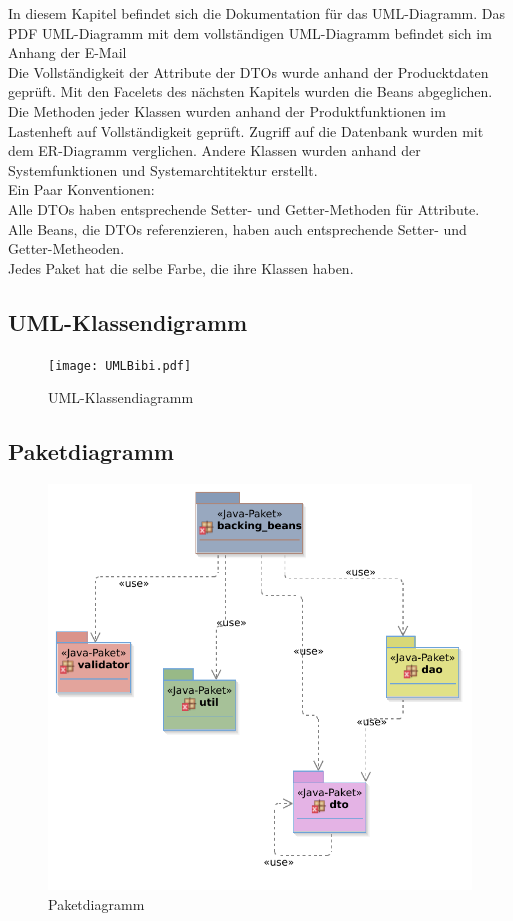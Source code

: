 \documentclass{article}
\begin{document}
In diesem Kapitel befindet sich die Dokumentation für das UML-Diagramm. Das PDF UML-Diagramm mit dem vollständigen  UML-Diagramm befindet sich im Anhang der E-Mail\\
Die Vollständigkeit der Attribute der DTOs wurde anhand der Producktdaten geprüft.
Mit den Facelets des nächsten Kapitels wurden die Beans  abgeglichen.
Die Methoden jeder Klassen wurden anhand der Produktfunktionen im Lastenheft auf Vollständigkeit geprüft. Zugriff auf die Datenbank wurden mit dem ER-Diagramm verglichen. Andere Klassen wurden anhand der Systemfunktionen und Systemarchtitektur erstellt.\\
Ein Paar Konventionen:\\
Alle DTOs haben entsprechende Setter- und Getter-Methoden für Attribute.\\
Alle Beans, die DTOs referenzieren, haben auch entsprechende Setter- und Getter-Metheoden.\\
Jedes Paket hat die selbe Farbe, die ihre Klassen haben.
\subsection{UML-Klassendigramm}

\begin{figure}[H]
\hypertarget{Session}{}
    \texttt{[image: UMLBibi.pdf]}
    \caption{UML-Klassendiagramm}
    \label{fig:UML-Klassendkígrramm}
\end{figure}

\subsection{Paketdiagramm}

\begin{figure}[H]
    \centering
    \includegraphics[scale=0.5]{Paketdiagramm.pdf}
    \caption{Paketdiagramm}
    \label{fig:UML-Paketdkígrramm}
\end{figure}
\end{document}

